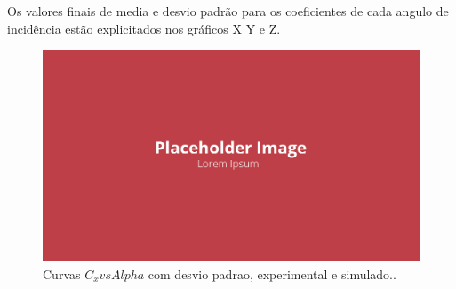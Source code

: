 Os valores finais de media e desvio padrão para os coeficientes de cada angulo de incidência estão explicitados nos gráficos X Y e Z.

\begin{figure}[!ht]
    \centering
    \includegraphics[width=.8\linewidth]{figuras/outras/placeholder.png}
    \caption{Curvas $C_x vs Alpha$ com desvio padrao, experimental e simulado.\cite{autor}.}
    \label{fig:coefficients_alpha_plot}
\end{figure}







